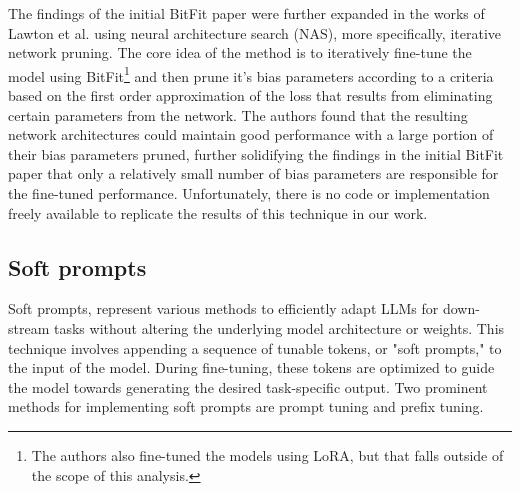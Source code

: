 \documentclass[fleqn,moreauthors,10pt]{ds_report}
\begin{document}
The findings of the initial BitFit paper were further expanded in the works of Lawton et al.\cite{us-bitfit} using neural architecture search (NAS), more specifically, iterative network pruning. The core idea of the method is to iteratively fine-tune the model using BitFit\footnote{The authors also fine-tuned the models using LoRA, but that falls outside of the scope of this analysis.} and then prune it's bias parameters according to a criteria based on the first order approximation of the loss that results from eliminating certain parameters from the network. The authors found that the resulting network architectures could maintain good performance with a large portion of their bias parameters pruned, further solidifying the findings in the initial BitFit paper that only a relatively small number of bias parameters are responsible for the fine-tuned performance. Unfortunately, there is no code or implementation freely available to replicate the results of this technique in our work.


\iffalse
- Sparse-finetunning technique
- Only updates bias-terms of attention modules
- Main hypothesis: finetunning is about exposing knowledge induced by language-modeling training?
- Trains only 0.1%
    - Even Lower if we only train the bias of the query encoders and third layer of FF. In this case it trains 0.04%
- \textbf{Results:}
    - Achieves similar performance than FFT in the Glue benchmark using LargeBert (question: finetunes for each task?), and similar or better performance than other comparable techniques at the time with only a fraction of the parameters they use
    - BitFit is more data efficient than FFT: it achieves better results then FFT in small-medium data regimes

\textbf{Lottery Ticket Hypothesis}

(Frankle and Carbin, 2019; Chen et al., 2020; Prasanna et al., 2020) 

\textit{Include in introduction}

The conjecture that large models are needed in pretraining only to induce (in high probability) the existing of sub-networks initialized with the correct inductive bias for learning.

\fi

\subsection*{Soft prompts}
Soft prompts, represent various methods to efficiently adapt LLMs for down-stream tasks without altering the underlying model architecture or weights. This technique involves appending a sequence of tunable tokens, or "soft prompts," to the input of the model. During fine-tuning, these tokens are optimized to guide the model towards generating the desired task-specific output. Two prominent methods for implementing soft prompts are prompt tuning and prefix tuning. 
\end{document}
